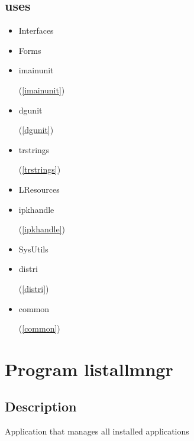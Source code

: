 \documentclass{report}
\begin{document}
\section{uses}
\begin{itemize}
\item \begin{ttfamily}Interfaces\end{ttfamily}\item \begin{ttfamily}Forms\end{ttfamily}\item \begin{ttfamily}imainunit\end{ttfamily}(\ref{imainunit})\item \begin{ttfamily}dgunit\end{ttfamily}(\ref{dgunit})\item \begin{ttfamily}trstrings\end{ttfamily}(\ref{trstrings})\item \begin{ttfamily}LResources\end{ttfamily}\item \begin{ttfamily}ipkhandle\end{ttfamily}(\ref{ipkhandle})\item \begin{ttfamily}SysUtils\end{ttfamily}\item \begin{ttfamily}distri\end{ttfamily}(\ref{distri})\item \begin{ttfamily}common\end{ttfamily}(\ref{common})\end{itemize}
\chapter{Program listallmngr}
\label{listallmngr}
\section{Description}
Application that manages all installed applications
\end{document}
